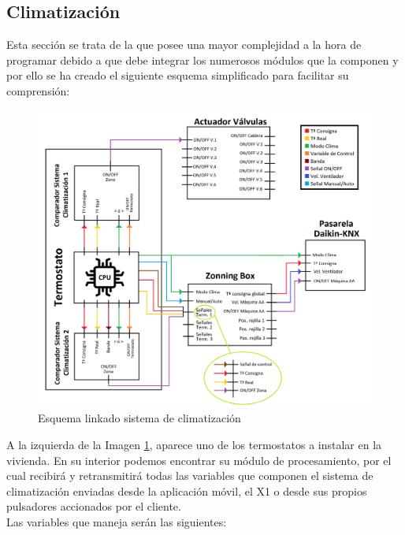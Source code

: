 \subsection{Climatización}Esta sección se trata de la que posee una mayor complejidad a la hora de programar debido a que debe integrar los numerosos módulos que la componen y por ello se ha creado el siguiente esquema simplificado para facilitar su comprensión:
 \begin{center}
\begin{figure}[H]
\includegraphics[width=1.15\textwidth]{figures/prog_termost.png}   
\caption{Esquema linkado sistema de climatización}
\label{fig:prog_termost}
\end{figure}
\end{center}
A la izquierda de la Imagen \ref{fig:prog_termost}, aparece uno de los termostatos a instalar en la vivienda. En su interior podemos encontrar su módulo de procesamiento, por el cual recibirá y retransmitirá todas las variables que componen el sistema de climatización enviadas desde la aplicación móvil, el X1 o desde sus propios pulsadores accionados por el cliente. \\Las variables que maneja serán las siguientes: 
